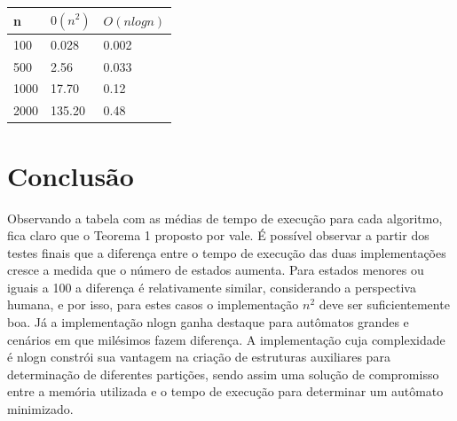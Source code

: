 \documentclass[12pt]{article}
\begin{document}
\begin{table}[ht!]
\begin{center}   
\begin{tabular}{|l|l|l|}
\hline
\textbf{n} & \textbf{$0(n^2)$} & \textit{\textbf{$O(n log{}n)$}} \\ \hline
100        & 0.028             & 0.002                           \\ \hline
500        & 2.56              & 0.033                           \\ \hline
1000       & 17.70             & 0.12                            \\ \hline
2000       & 135.20            & 0.48                            \\ \hline
\end{tabular}
\end{center}
\end{table}


\section{Conclusão}

Observando a tabela com as médias de tempo de execução para cada algoritmo, fica claro que o Teorema 1 proposto por \cite{blum1996n} vale. É possível observar a partir dos testes finais que a diferença entre o tempo de execução das duas implementações cresce a medida que o número de estados aumenta. Para estados menores ou iguais a 100 a diferença é relativamente similar, considerando a perspectiva humana, e por isso, para estes casos o implementação $n^2$ deve ser suficientemente boa. Já a implementação nlogn ganha destaque para autômatos grandes e cenários em que milésimos fazem diferença. 
A implementação cuja complexidade é nlogn constrói sua vantagem na criação de estruturas auxiliares para determinação de diferentes partições, sendo assim uma solução de compromisso entre a memória utilizada e o tempo de execução para determinar um autômato minimizado. 



\end{document}
